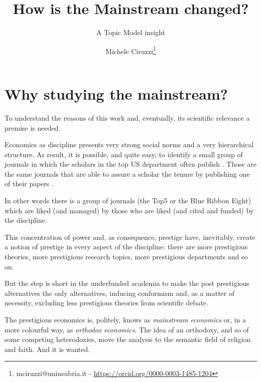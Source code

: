 \documentclass[a4paper, 11pt, headings=standardclasses, tablecaptionsbelow]{scrartcl}
\title{How is the Mainstream changed? \let\thefootnote\relax\footnotetext{This version is intended to be submitted to the XV ESHET Conference \\ An updated version of this paper and all the source code and the instructons required to replicate the paper are available at \url{https://github.com/TnTo/mainstream/}}}
\subtitle{A Topic Model insight}
\author{Michele Ciruzzi\thanks{mciruzzi@uninsubria.it - \url{https://orcid.org/0000-0003-1485-1204}}}
\begin{document}
\maketitle


\section{Why studying the mainstream?}
To understand the reasons of this work and, eventually, its scientific relevance a premise is needed.

Economics as discipline presents very strong social norms and a very hierarchical structure.
As result, it is possible, and quite easy, to identify a small group of journals in which the scholars in the top US department often publish \parencite{card2013,kim2006,kim2009,dusansky1998,hamermesh2013,ellison2003,heck2006}.
Those are the same journals that are able to assure a scholar the tenure by publishing one of their papers \parencite{heckman2020}.

In other words there is a group of journals (the Top5 or the Blue Ribbon Eight) which are liked (and managed) by those who are liked (and cited and funded) by the discipline.

This concentration of power and, as consequence, prestige have, inevitably, create a notion of prestige in every aspect of the discipline: there are more prestigious theories, more prestigious research topics, more prestigious departments and so on.

But the step is short in the underfunded academia to make the post prestigious alternatives the only alternatives, inducing conformism and, as a matter of necessity, excluding less prestigious theories from scientific debate.

The prestigious economics is, politely, knows as \textit{mainstream economics} or, in a more colourful way, as \textit{orthodox economics}. The idea of an orthodoxy, and so of some competing heterodoxies, move the analysis to the semantic field of religion and faith. And it is wanted.
\end{document}
